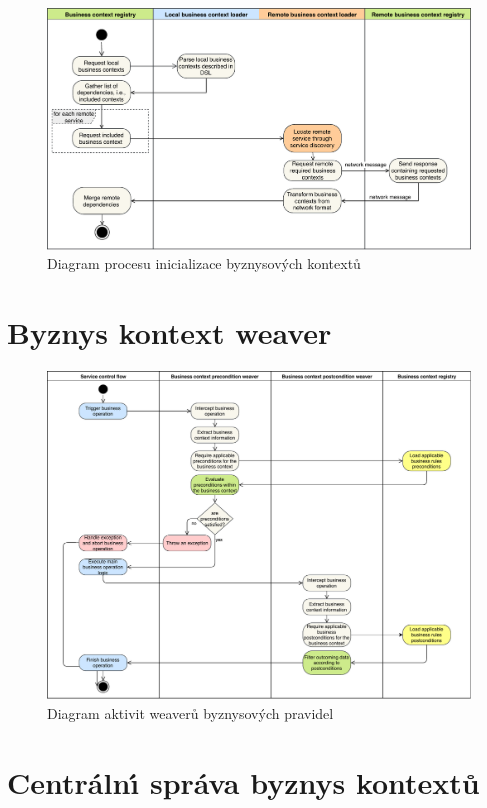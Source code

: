 \begin{figure}
    \centering
    \includegraphics[keepaspectratio=true, width=0.8\linewidth]{figures/business-context-loading.pdf}
    \caption{Diagram procesu inicializace byznysov\'ych kontextů}
    \label{fig:business-context-loading}
\end{figure} %

\section{Byznys kontext weaver}

\begin{figure}
    \centering
    \includegraphics[keepaspectratio=true, width=0.8\linewidth]{figures/business-rules-weaver.pdf}
    \caption{Diagram aktivit weaverů byznysov\'ych pravidel}
    \label{fig:business-rules-weaver}
\end{figure} %

\section{Centráln\'{\i} správa byznys kontextů}


